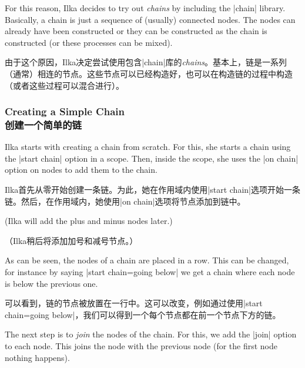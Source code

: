 For this reason, Ilka decides to try out \emph{chains} by including
the |chain| library. Basically, a chain is just a sequence of
(usually) connected nodes. The nodes can already have been constructed
or they can be constructed as the chain is constructed (or these
processes can be mixed).

由于这个原因，Ilka决定尝试使用包含|chain|库的\emph{chains}。基本上，链是一系列（通常）相连的节点。这些节点可以已经构造好，也可以在构造链的过程中构造（或者这些过程可以混合进行）。



\subsubsection{Creating a Simple Chain\\创建一个简单的链}


Ilka starts with creating a chain from scratch. For this, she starts a
chain using the |start chain| option in a scope. Then, inside the
scope, she uses the |on chain| option on nodes to add them to the
chain.

Ilka首先从零开始创建一条链。为此，她在作用域内使用|start chain|选项开始一条链。然后，在作用域内，她使用|on chain|选项将节点添加到链中。

\begin{codeexample}[]
\end{codeexample}
(Ilka will add the plus and minus nodes later.)

（Ilka稍后将添加加号和减号节点。）

As can be seen, the nodes of a chain are placed in a row. This can be
changed, for instance by saying |start chain=going below| we get a
chain where each node is below the previous one.

可以看到，链的节点被放置在一行中。这可以改变，例如通过使用|start chain=going below|，我们可以得到一个每个节点都在前一个节点下方的链。

The next step is to \emph{join} the nodes of the chain. For this, we
add the |join| option to each node. This joins the node with the
previous node (for the first node nothing happens).

